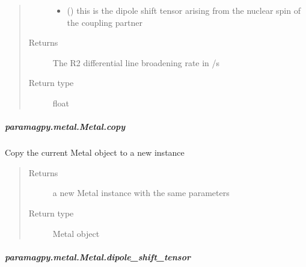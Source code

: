 \documentclass[a4paper,10pt,english,openany,oneside]{sphinxmanual}
\begin{document}
\begin{fulllineitems}
\begin{fulllineitems}
\begin{fulllineitems}
\begin{quote}
\begin{description}
\begin{itemize}
\item {} 
 () \textendash{} this is the dipole shift tensor arising from
the nuclear spin of the coupling partner

\end{itemize}

\item[{Returns}] \leavevmode
{} \textendash{} The R2 differential line broadening rate in /s

\item[{Return type}] \leavevmode
float

\end{description}\end{quote}

\end{fulllineitems}



\subparagraph{paramagpy.metal.Metal.copy}
\label{\detokenize{reference/generated/paramagpy.metal.Metal.copy:paramagpy-metal-metal-copy}}\label{\detokenize{reference/generated/paramagpy.metal.Metal.copy::doc}}

\begin{fulllineitems}
\label{\detokenize{reference/generated/paramagpy.metal.Metal.copy:paramagpy.metal.Metal.copy}}
Copy the current Metal object to a new instance
\begin{quote}\begin{description}
\item[{Returns}] \leavevmode
{} \textendash{} a new Metal instance with the same parameters

\item[{Return type}] \leavevmode
Metal object

\end{description}\end{quote}

\end{fulllineitems}



\subparagraph{paramagpy.metal.Metal.dipole\_shift\_tensor}
\label{\detokenize{reference/generated/paramagpy.metal.Metal.dipole_shift_tensor:paramagpy-metal-metal-dipole-shift-tensor}}\label{\detokenize{reference/generated/paramagpy.metal.Metal.dipole_shift_tensor::doc}}


\end{fulllineitems}
\end{fulllineitems}
\end{document}
